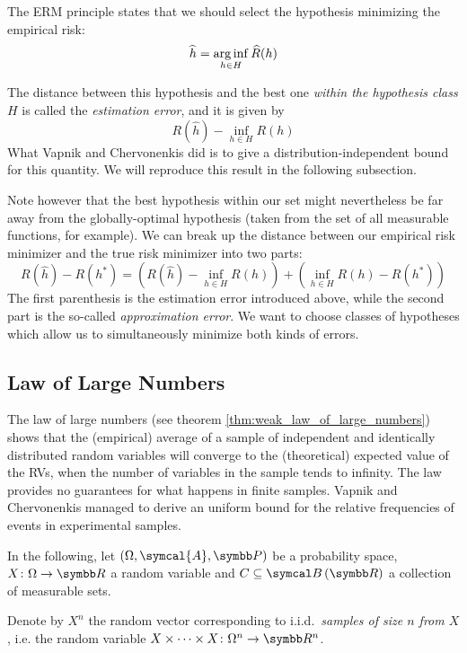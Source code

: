 The ERM principle states that we should select the hypothesis minimizing the empirical risk:
\[
    \widehat{h} = \operatorname*{arg\,inf}_{h \in H} \widehat{R}(h)
\]

The distance between this hypothesis and the best one \emph{within the hypothesis class \(H\)} is called the \emph{estimation error}, and it is given by
\[
    R\left(\widehat{h}\right) - \inf_{h \in H} R(h)
\]
What Vapnik and Chervonenkis did is to give a distribution-independent bound for this quantity. We will reproduce this result in the following subsection.

Note however that the best hypothesis within our set might nevertheless be far away from the globally-optimal hypothesis (taken from the set of all measurable functions, for example). We can break up the distance between our empirical risk minimizer and the true risk minimizer into two parts:
\[
    R\left(\widehat{h}\right) - R\left(h^*\right) = \left(R\left(\widehat{h}\right) - \inf_{h \in H} R(h)\right) + \left(\inf_{h \in H} R(h) - R\left(h^*\right)\right)
\]
The first parenthesis is the estimation error introduced above, while the second part is the so-called \emph{approximation error}. We want to choose classes of hypotheses which allow us to simultaneously minimize both kinds of errors.

\subsection{Law of Large Numbers}

The law of large numbers (see theorem \ref{thm:weak_law_of_large_numbers}) shows that the (empirical) average of a sample of independent and identically distributed random variables will converge to the (theoretical) expected value of the RVs, when the number of variables in the sample tends to infinity. The law provides no guarantees for what happens in finite samples. Vapnik and Chervonenkis managed to derive an uniform bound for the relative frequencies of events in experimental samples.

In the following, let \(\left(\Omega, \symcal{A}, \probability\right)\) be a probability space, \(X \colon \Omega \to \reals\) a random variable and \(C \subseteq \borelsets{\reals}\) a collection of measurable sets.

\begin{definition}
Denote by \(X^{n}\) the random vector corresponding to i.i.d.\ \emph{samples of size \(n\) from \(X\)}, i.e. the random variable \(X \times \dots \times X \colon \Omega^n \to \reals^n\).
\end{definition}

